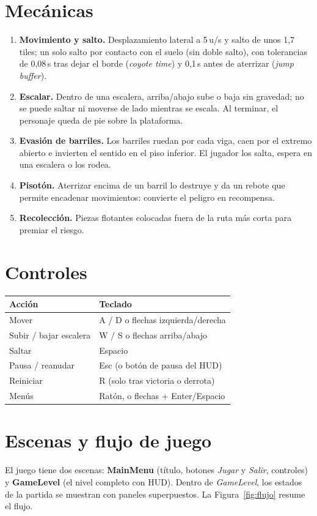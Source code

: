 \documentclass[11pt,letterpaper]{article}
\begin{document}
\section{Mecánicas}
\begin{enumerate}[label=\textbf{M\arabic*.}]
\item \textbf{Movimiento y salto.} Desplazamiento lateral a 5\,u/s y salto de unos 1,7 tiles; un solo
salto por contacto con el suelo (sin doble salto), con tolerancias de 0,08\,s tras dejar el borde
(\emph{coyote time}) y 0,1\,s antes de aterrizar (\emph{jump buffer}).
\item \textbf{Escalar.} Dentro de una escalera, arriba/abajo sube o baja sin gravedad; no se puede saltar
ni moverse de lado mientras se escala. Al terminar, el personaje queda de pie sobre la plataforma.
\item \textbf{Evasión de barriles.} Los barriles ruedan por cada viga, caen por el extremo abierto e
invierten el sentido en el piso inferior. El jugador los salta, espera en una escalera o los rodea.
\item \textbf{Pisotón.} Aterrizar encima de un barril lo destruye y da un rebote que permite encadenar
movimientos: convierte el peligro en recompensa.
\item \textbf{Recolección.} Piezas flotantes colocadas fuera de la ruta más corta para premiar el riesgo.
\end{enumerate}

\section{Controles}
\begin{tabularx}{\linewidth}{@{}lX@{}}
\toprule
\textbf{Acción} & \textbf{Teclado} \\ \midrule
Mover & A / D o flechas izquierda/derecha \\
Subir / bajar escalera & W / S o flechas arriba/abajo \\
Saltar & Espacio \\
Pausa / reanudar & Esc (o botón de pausa del HUD) \\
Reiniciar & R (solo tras victoria o derrota) \\
Menús & Ratón, o flechas + Enter/Espacio \\
\bottomrule
\end{tabularx}

\section{Escenas y flujo de juego}
\vspace{-2pt}
El juego tiene dos escenas: \textbf{MainMenu} (título, botones \emph{Jugar} y \emph{Salir}, controles) y
\textbf{GameLevel} (el nivel completo con HUD). Dentro de \emph{GameLevel}, los estados de la partida se
muestran con paneles superpuestos. La Figura~\ref{fig:flujo} resume el flujo.
\end{document}
